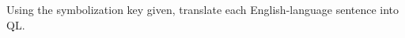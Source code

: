 

\practiceproblems

\solutions
\problempart
\label{pr.QLalligators}
Using the symbolization key given, translate each English-language sentence into QL.

